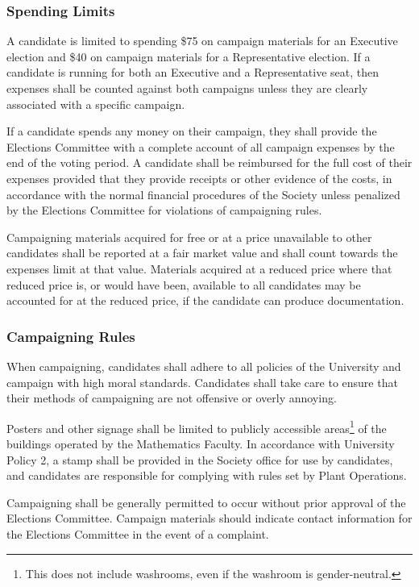 \subsubsection{Spending Limits}
A candidate is limited to spending \$75 on campaign materials for an Executive election and \$40 on campaign materials for a Representative election.
If a candidate is running for both an Executive and a Representative seat, then expenses shall be counted against both campaigns unless they are clearly associated with a specific campaign.

If a candidate spends any money on their campaign, they shall provide the Elections Committee with a complete account of all campaign expenses by the end of the voting period.
A candidate shall be reimbursed for the full cost of their expenses provided that they provide receipts or other evidence of the costs, in accordance with the normal financial procedures of the Society unless penalized by the  Elections Committee for violations of campaigning rules.

Campaigning materials acquired for free or at a price unavailable to other candidates shall be reported at a fair market value and shall count towards the expenses limit at that value.
Materials acquired at a reduced price where that reduced price is, or would have been, available to all candidates may be accounted for at the reduced price, if the candidate can produce documentation.

\subsubsection{Campaigning Rules}
When campaigning, candidates shall adhere to all policies of the University and campaign with high moral standards.
Candidates shall take care to ensure that their methods of campaigning are not offensive or overly annoying.

Posters and other signage shall be limited to publicly accessible areas\footnote{This does not include washrooms, even if the washroom is gender-neutral.} of the buildings operated by the Mathematics Faculty.
In accordance with University Policy 2, a stamp shall be provided in the Society office for use by candidates, and candidates are responsible for complying with rules set by Plant Operations.

Campaigning shall be generally permitted to occur without prior approval of the Elections Committee.
Campaign materials should indicate contact information for the Elections Committee in the event of a complaint.

